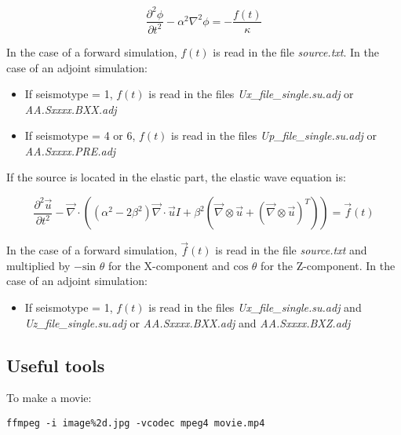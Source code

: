 \documentclass{article}
\begin{document}
\begin{equation}
\frac{\partial ^2 \phi}{\partial t^2} - \alpha ^2 \nabla ^2 \phi = - \frac{f(t)}{\kappa}
\end{equation}

In the case of a forward simulation, $f(t)$ is read in the file \textit{source.txt}. In the case of an adjoint simulation:

\begin{itemize}
	\item If seismotype = 1, $f(t)$ is read in the files \textit{Ux\_file\_single.su.adj} or \textit{AA.Sxxxx.BXX.adj}
	\item If seismotype = 4 or 6, $f(t)$ is read in the files \textit{Up\_file\_single.su.adj} or \textit{AA.Sxxxx.PRE.adj}
\end{itemize}
 
 If the source is located in the elastic part, the elastic wave equation is:

\begin{equation}
\frac{\partial ^2 \vec{u} }{\partial t^2} - \vec\nabla \cdot ( (\alpha ^2 - 2 \beta ^2) \vec\nabla \cdot \vec{u} I + \beta ^2 (\vec\nabla \otimes \vec{u} + (\vec\nabla \otimes \vec{u}) ^T) ) = \vec{f}(t)
\end{equation}

In the case of a forward simulation, $\vec{f}(t)$ is read in the file \textit{source.txt} and multiplied by $-\text{sin }\theta$ for the X-component and $\text{cos } \theta$ for the Z-component. In the case of an adjoint simulation:

\begin{itemize}
	\item If seismotype = 1, $f(t)$ is read in the files \textit{Ux\_file\_single.su.adj} and \textit{Uz\_file\_single.su.adj} or \textit{AA.Sxxxx.BXX.adj} and \textit{AA.Sxxxx.BXZ.adj}
\end{itemize}

\subsection{Useful tools}

To make a movie:

\begin{verbatim}
ffmpeg -i image%2d.jpg -vcodec mpeg4 movie.mp4
\end{verbatim}
\end{document}
